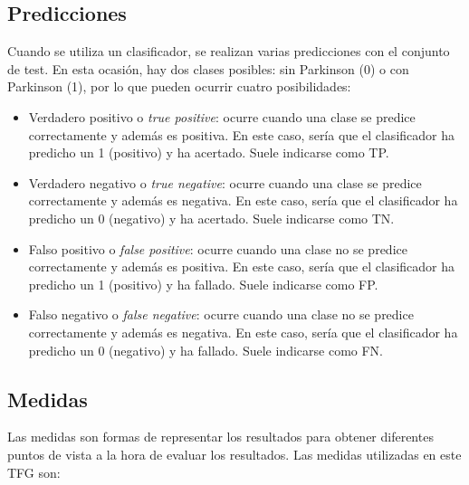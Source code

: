 \subsection{Predicciones}
Cuando se utiliza un clasificador, se realizan varias predicciones con el conjunto de test. En esta ocasión, hay dos clases posibles: sin Parkinson (0) o con Parkinson (1), por lo que pueden ocurrir cuatro posibilidades:

\begin{itemize}
	\item Verdadero positivo o \textit{true positive}: ocurre cuando una clase se predice correctamente y además es positiva. En este caso, sería que el clasificador ha predicho un 1 (positivo) y ha acertado. Suele indicarse como TP.
	\item Verdadero negativo o \textit{true negative}: ocurre cuando una clase se predice correctamente y además es negativa. En este caso, sería que el clasificador ha predicho un 0 (negativo) y ha acertado. Suele indicarse como TN.
	\item Falso positivo o \textit{false positive}: ocurre cuando una clase no se predice correctamente y además es positiva. En este caso, sería que el clasificador ha predicho un 1 (positivo) y ha fallado. Suele indicarse como FP.
	\item Falso negativo o \textit{false negative}: ocurre cuando una clase no se predice correctamente y además es negativa. En este caso, sería que el clasificador ha predicho un 0 (negativo) y ha fallado. Suele indicarse como FN.
	
\end{itemize}

\subsection{Medidas}
Las medidas son formas de representar los resultados para obtener diferentes puntos de vista a la hora de evaluar los resultados. Las medidas utilizadas en este TFG son:

